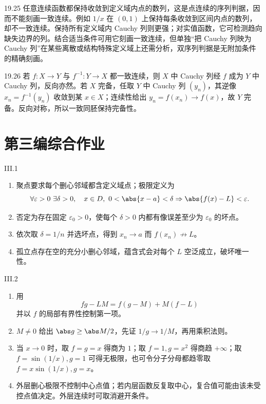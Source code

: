 \begin{solution}{19.25}
任意连续函数都保持收敛到定义域内点的数列，这是点连续的序列判据，因而不能刻画一致连续。例如 \(1/x\) 在 \((0,1)\) 上保持每条收敛到区间内点的数列，却不一致连续。保持所有定义域内 Cauchy 列则更强；对实值函数，它可检测趋向缺失边界的列。结合适当条件可用它刻画一致连续，但单独“把 Cauchy 列映为 Cauchy 列”在某些离散或结构特殊定义域上还需分析，双序列判据是无附加条件的精确刻画。
\end{solution}

\begin{solution}{19.26}
若 \(f:X\to Y\) 与 \(f^{-1}:Y\to X\) 都一致连续，则 \(X\) 中 Cauchy 列经 \(f\) 成为 \(Y\) 中 Cauchy 列，反向亦然。若 \(X\) 完备，任取 \(Y\) 中 Cauchy 列 \((y_n)\)，其逆像 \(x_n=f^{-1}(y_n)\) 收敛到某 \(x\in X\)；连续性给出 \(y_n=f(x_n)\to f(x)\)，故 \(Y\) 完备。反向对称，所以一致同胚保持完备性。
\end{solution}

\section*{第三编综合作业}

\begin{solution}{III.1}
\begin{enumerate}
 \item 聚点要求每个删心邻域都含定义域点；极限定义为
 \[
  \forall\varepsilon>0\ \exists\delta>0,\quad
  x\in D,\ 0<\abs{x-a}<\delta
  \Rightarrow\abs{f(x)-L}<\varepsilon.
 \]
 \item 否定为存在固定 \(\varepsilon_0>0\)，使每个 \(\delta>0\) 内都有像误差至少为 \(\varepsilon_0\) 的坏点。
 \item 依次取 \(\delta=1/n\) 并选坏点，得到 \(x_n\to a\) 而 \(f(x_n)\not\to L\)。
 \item 孤立点存在空的充分小删心邻域，蕴含式会对每个 \(L\) 空泛成立，破坏唯一性。
\end{enumerate}
\end{solution}

\begin{solution}{III.2}
\begin{enumerate}
 \item 用
 \[
  fg-LM=f(g-M)+M(f-L)
 \]
 并以 \(f\) 的局部有界性控制第一项。
 \item \(M\ne0\) 给出 \(\abs g\ge\abs M/2\)，先证 \(1/g\to1/M\)，再用乘积法则。
 \item 当 \(x\to0\) 时，取 \(f=g=x\) 得商为 \(1\)；取 \(f=1,g=x^2\) 得商趋 \(+\infty\)；取 \(f=\sin(1/x),g=1\) 可得无极限，也可令分子分母都趋零取 \(f=x\sin(1/x),g=x\)。
 \item 外层删心极限不控制中心点值；若内层函数反复取中心，复合值可能由该未受控点值决定。外层连续时可取消避开条件。
\end{enumerate}
\end{solution}

